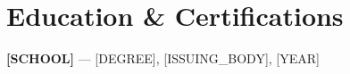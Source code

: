 \documentclass[10pt,letterpaper]{article}
\begin{document}
\section*{Education \& Certifications}
\textbf{[SCHOOL]} --- [DEGREE]\newline
[CERTIFICATION], [ISSUING_BODY], [YEAR]
\end{document}
